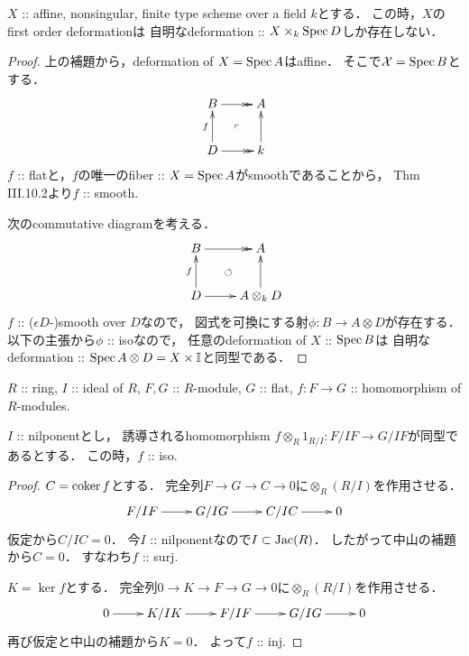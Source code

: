 \documentclass[a4paper]{jsarticle}
\newcommand{\dualnum}{\mathbb{I}}
\newcommand{\famX}{\mathcal{X}}
\begin{document}
    \begin{Lemma}\label{thm:aff_is_rigid}
        $X$ :: affine, nonsingular, finite type scheme over a field $k$とする．
        この時，$X$のfirst order deformationは
        自明なdeformation :: $X \times_k \operatorname{Spec} D$しか存在しない．
    \end{Lemma}
    \begin{proof}
        上の補題から，deformation of $X=\operatorname{Spec} A$はaffine．
        そこで$\famX=\Spec B$とする．
        \[\vcenter{\xymatrix{
            B \ar@{->>}[r]& A \\
            D \ar@{->>}[r] \ar[u]^-{f}& k \ar[u]
            \ar@{}[lu]|{\ulcorner}
        }}\]
        $f$ :: flatと，$f$の唯一のfiber :: $X=\operatorname{Spec} A$がsmoothであることから，
        \cite{HarAG} Thm III.10.2より$f$ :: smooth.

        次のcommutative diagramを考える．
        \[\vcenter{\xymatrix{
            B \ar@{->>}[r]& A \\
            D \ar@{->}[r] \ar[u]^-{f}& A \otimes_{k} D \ar[u]
            \ar@{}[lu]|{\circlearrowleft}
        }}\]
        $f$ :: ($\epsilon D$-)smooth over $D$なので，
        図式を可換にする射$\phi: B \to A \otimes D$が存在する．
        以下の主張から$\phi$ :: isoなので，
        任意のdeformation of $X$ :: $\operatorname{Spec} B$は
        自明なdeformation :: $\Spec A \otimes D=X \times \dualnum$と同型である．
    \end{proof}

    \begin{Claim}
        $R$ :: ring,
        $I$ :: ideal of $R$,
        $F, G$ :: $R$-module, $G$ :: flat,
        $f: F \to G$ :: homomorphism of $R$-modules.

        $I$ :: nilponentとし，
        誘導されるhomomorphism
        $f \otimes_{R} 1_{R/I}: F/IF \to G/IF$が同型であるとする．
        この時，$f$ :: iso.
    \end{Claim}
    \begin{proof}
        $C=\operatorname{coker} f$とする．
        完全列$F \to G \to C \to 0$に$\otimes_{R} (R/I)$を作用させる．
        \[\xymatrix{
            F/IF \ar[r]& G/IG \ar[r]& C/IC \ar[r]& 0
        }\]
        仮定から$C/IC=0$．
        今$I$ :: nilponentなので$I \subset \operatorname{Jac}(R)$．
        したがって中山の補題から$C=0$．
        すなわち$f$ :: surj.

        $K=\ker f$とする．
        完全列$0 \to K \to F \to G \to 0$に$\otimes_{R} (R/I)$を作用させる．
        \[\xymatrix{
                0 \ar[r]& K/IK \ar[r]& F/IF \ar[r]& G/IG \ar[r]& 0
        }\]
        再び仮定と中山の補題から$K=0$．
        よって$f$ :: inj.
    \end{proof}
\end{document}
